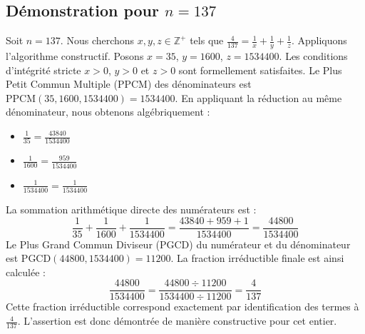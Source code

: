 \documentclass[11pt,a4paper]{article}
\begin{document}
\subsection{Démonstration pour $n = 137$}
Soit $n = 137$. Nous cherchons $x, y, z \in \mathbb{Z}^{+}$ tels que $\frac{4}{137} = \frac{1}{x} + \frac{1}{y} + \frac{1}{z}$.
Appliquons l'algorithme constructif. Posons $x = 35$, $y = 1600$, $z = 1534400$.
Les conditions d'intégrité stricte $x > 0$, $y > 0$ et $z > 0$ sont formellement satisfaites.
Le Plus Petit Commun Multiple (PPCM) des dénominateurs est $\text{PPCM}(35, 1600, 1534400) = 1534400$.
En appliquant la réduction au même dénominateur, nous obtenons algébriquement :
\begin{itemize}
    \item $\frac{1}{35} = \frac{43840}{1534400}$
    \item $\frac{1}{1600} = \frac{959}{1534400}$
    \item $\frac{1}{1534400} = \frac{1}{1534400}$
\end{itemize}
La sommation arithmétique directe des numérateurs est :
$$ \frac{1}{35} + \frac{1}{1600} + \frac{1}{1534400} = \frac{43840 + 959 + 1}{1534400} = \frac{44800}{1534400} $$
Le Plus Grand Commun Diviseur (PGCD) du numérateur et du dénominateur est $\text{PGCD}(44800, 1534400) = 11200$.
La fraction irréductible finale est ainsi calculée :
$$ \frac{44800}{1534400} = \frac{44800 \div 11200}{1534400 \div 11200} = \frac{4}{137} $$
Cette fraction irréductible correspond exactement par identification des termes à $\frac{4}{137}$. L'assertion est donc démontrée de manière constructive pour cet entier.
\end{document}
